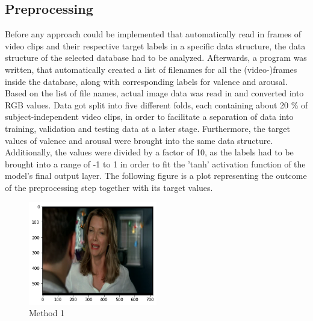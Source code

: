 \subsection{Preprocessing}
Before any approach could be implemented that automatically read in frames of video clips and their respective target labels in a specific data structure, the data structure of the selected database had to be analyzed.
\newline\newline
Afterwards, a program was written, that automatically created a list of filenames for all the (video-)frames inside the database, along with corresponding labels for valence and arousal. Based on the list of file names, actual image data was read in and converted into RGB values. Data got split into five different folds, each containing about 20 \% of subject-independent video clips, in order to facilitate a separation of data into training, validation and testing data at a later stage.
\newline\newline
Furthermore, the target values of valence and arousal were brought into the same data structure. Additionally, the values were divided by a factor of 10, as the labels had to be brought into a range of -1 to 1 in order to fit the 'tanh' activation function of the model's final output layer. The following figure is a plot representing the outcome of the preprocessing step together with its target values.


\begin{center}
\begin{figure}[H]
  \begin{center}
  \includegraphics[angle=0, width=0.5\textwidth]{Figures/method_1.png}
  \caption{Method 1}
  \label{fig:MachineLearningModelMethod_1}
  \end{center}
\end{figure}
\end{center}

